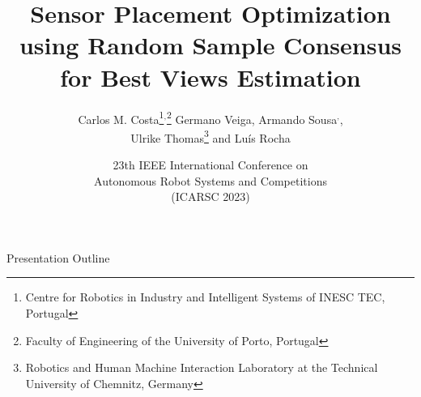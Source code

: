 





\title{\Large \bf Sensor Placement Optimization using Random Sample Consensus for Best Views Estimation}
\author{\small
	Carlos M. Costa\thanks{\tiny Centre for Robotics in Industry and Intelligent Systems of INESC TEC, Portugal}$^,$\thanks{\tiny Faculty of Engineering of the University of Porto, Portugal}
	Germano Veiga\footnotemark[1],
	Armando Sousa\footnotemark[1]$^,$\footnotemark[2],\\
	Ulrike Thomas\thanks{\tiny Robotics and Human Machine Interaction Laboratory at the Technical University of Chemnitz, Germany} and
	Luís Rocha\footnotemark[1]
}
\date{\small 23th IEEE International Conference on\\Autonomous Robot Systems and Competitions\\(ICARSC 2023)}




\begin{frame}
	\titlepage
\end{frame}




\begin{frame}{Presentation Outline}
	\begingroup
	\large
	\tableofcontents
	\endgroup
\end{frame}













